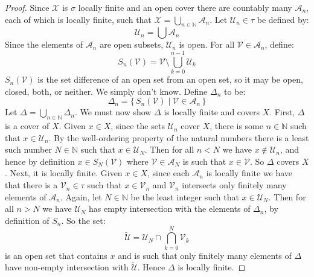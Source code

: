 \documentclass{article}
\theoremstyle{plain}
\theoremstyle{normal}
\begin{document}
        \begin{proof}
            Since $\mathcal{X}$ is $\sigma$ locally finite and an open cover
            there are countably many $\mathcal{A}_{n}$, each of which is
            locally finite, such that
            $\mathcal{X}=\bigcup_{n\in\mathbb{N}}\mathcal{A}_{n}$. Let
            $\mathcal{U}_{n}\in\tau$ be defined by:
            \begin{equation}
                \mathcal{U}_{n}=\bigcup\mathcal{A}_{n}
            \end{equation}
            Since the elements of $\mathcal{A}_{n}$ are open subsets,
            $\mathcal{U}_{n}$ is open. For all
            $\mathcal{V}\in\mathcal{A}_{n}$, define:
            \begin{equation}
                S_{n}(\mathcal{V})=
                \mathcal{V}\setminus\bigcup_{k=0}^{n-1}\mathcal{U}_{k}
            \end{equation}
            $S_{n}(\mathcal{V})$ is the set difference of an open set from
            an open set, so it may be open, closed, both, or neither. We simply
            don't know. Define $\Delta_{n}$ to be:
            \begin{equation}
                \Delta_{n}
                =\{\,S_{n}(\mathcal{V})\;|\;\mathcal{V}\in\mathcal{A}_{n}\,\}
            \end{equation}
            Let $\Delta=\bigcup_{n\in\mathbb{N}}\Delta_{n}$. We must now show
            $\Delta$ is locally finite and covers $X$. First, $\Delta$ is a
            cover of $X$. Given $x\in{X}$, since the sets $\mathcal{U}_{n}$ cover
            $X$, there is some $n\in\mathbb{N}$ such that $x\in\mathcal{U}_{n}$.
            By the well-ordering property of the natural numbers there is a
            least such number $N\in\mathbb{N}$ such that $x\in\mathcal{U}_{N}$.
            Then for all $n<N$ we have $x\notin\mathcal{U}_{n}$, and hence
            by definition $x\in{S}_{N}(\mathcal{V})$ where
            $\mathcal{V}\in\mathcal{A}_{N}$ is such that $x\in\mathcal{V}$. So
            $\Delta$ covers $X$. Next, it is locally finite. Given
            $x\in{X}$, since each $\mathcal{A}_{n}$ is locally finite we have
            that there is a $\mathcal{V}_{n}\in\tau$ such that
            $x\in\mathcal{V}_{n}$ and $\mathcal{V}_{n}$ intersects only
            finitely many elements of $\mathcal{A}_{n}$. Again, let
            $N\in\mathbb{N}$ be the least integer such that
            $x\in\mathcal{U}_{N}$. Then for all $n>N$ we have
            $\mathcal{U}_{N}$ has empty intersection with the elements of
            $\Delta_{n}$, by definition of $S_{n}$. So the set:
            \begin{equation}
                \tilde{\mathcal{U}}
                =\mathcal{U}_{N}\cap\bigcap_{k=0}^{N}\mathcal{V}_{k}
            \end{equation}
            is an open set that contains $x$ and is such that only finitely
            many elements of $\Delta$ have non-empty intersection with
            $\tilde{\mathcal{U}}$. Hence $\Delta$ is locally finite.
        \end{proof}
\end{document}
